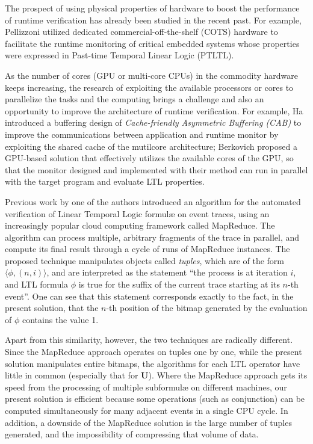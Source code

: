 The prospect of using physical properties of hardware to boost the performance of runtime verification has already been studied in the recent past. For example, Pellizzoni \etal\@ \citep{pellizzoni2008hardware} utilized dedicated commercial-off-the-shelf (COTS) hardware \citep{emerson1990temporal} to facilitate the runtime monitoring of critical embedded systems whose properties were expressed in Past-time Temporal Linear Logic (PTLTL).

As the number of cores (GPU or multi-core CPUs) in the commodity hardware keeps increasing, the research of exploiting the available processors or cores to parallelize the tasks and the computing  brings a challenge and also an opportunity to improve the architecture of runtime verification. For example, Ha \etal\@ \citep{ha2009concurrent} introduced a buffering design of \emph{Cache-friendly Asymmetric Buffering (CAB)} to improve the communications between application and runtime monitor by exploiting the shared cache of the mutilcore architecture; Berkovich \etal\@ \citep{DBLP:journals/fmsd/BerkovichBF15} proposed a GPU-based solution that effectively utilizes the available cores of the GPU, so that the monitor designed and implemented with their method can run in parallel with the target program and evaluate LTL properties.

Previous work by one of the authors \citep{jocasa} introduced an algorithm for the automated verification of Linear Temporal Logic formul\ae{} on event traces, using an increasingly popular cloud computing framework called MapReduce. The algorithm can process multiple, arbitrary fragments of the trace in parallel, and compute its final result through a cycle of runs of MapReduce instances.
The proposed technique manipulates objects called \emph{tuples}, which are of the form $\langle \phi, (n, i)\rangle$, and are interpreted as the statement ``the process is at iteration $i$, and LTL formula $\phi$ is true for the suffix of the current trace starting at its $n$-th event''. One can see that this statement corresponds exactly to the fact, in the present solution, that the $n$-th position of the bitmap generated by the evaluation of $\phi$ contains the value 1.

Apart from this similarity, however, the two techniques are radically different. Since the MapReduce approach operates on tuples one by one, while the present solution manipulates entire bitmaps, the algorithms for each LTL operator have little in common (especially that for \textbf{U}). Where the MapReduce approach gets its speed from the processing of multiple subformul\ae{} on different machines, our present solution is efficient because some operations (such as conjunction) can be computed simultaneously for many adjacent events in a single CPU cycle. In addition, a downside of the MapReduce solution is the large number of tuples generated, and the impossibility of compressing that volume of data.

